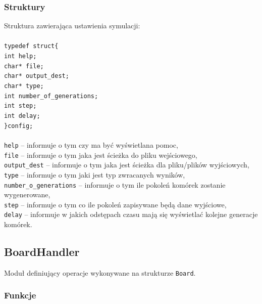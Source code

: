 \documentclass{article}
\begin{document}
\subsubsection{Struktury}
Struktura zawierająca ustawienia symulacji: \\\\
\texttt{typedef struct\{\\
	 \hspace*{10mm}int help;\\
	 \hspace*{10mm}char* file;\\
	 \hspace*{10mm}char* output\_dest;\\
	 \hspace*{10mm}char* type;\\
	 \hspace*{10mm}int number\_of\_generations;\\
	 \hspace*{10mm}int step;\\
	 \hspace*{10mm}int delay;\\
\}config;\\}
\\
\texttt{help} -- informuje o tym czy ma być wyświetlana pomoc,\\
\texttt{file} -- informuje o tym jaka jest ścieżka do pliku wejściowego,\\
\texttt{output\_dest} --  informuje o tym jaka jest ścieżka dla pliku/plików wyjściowych,\\
\texttt{type} -- informuje o tym jaki jest typ zwracanych wyników,\\
\texttt{number\_o\_generations} -- informuje o tym ile pokoleń komórek zostanie wygenerowane,\\
\texttt{step} -- informuje o tym co ile pokoleń zapisywane będą dane wyjściowe,\\
\texttt{delay} -- informuje w jakich odstępach czasu mają się wyświetlać kolejne generacje komórek.\\

\subsection{BoardHandler}
Moduł definiujący operacje wykonywane na strukturze \texttt{Board}.

\subsubsection{Funkcje}
\end{document}
